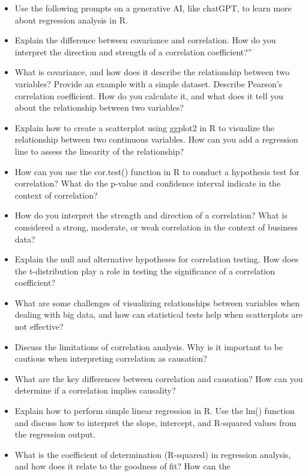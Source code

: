 \documentclass[
  letterpaper,
  DIV=11,
  numbers=noendperiod]{scrreprt}
\begin{document}
\begin{itemize}
\item
  Use the following prompts on a generative AI, like chatGPT, to learn
  more about regression analysis in R.
\item
  Explain the difference between covariance and correlation. How do you
  interpret the direction and strength of a correlation coefficient?''
\item
  What is covariance, and how does it describe the relationship between
  two variables? Provide an example with a simple dataset. Describe
  Pearson's correlation coefficient. How do you calculate it, and what
  does it tell you about the relationship between two variables?
\item
  Explain how to create a scatterplot using ggplot2 in R to visualize
  the relationship between two continuous variables. How can you add a
  regression line to assess the linearity of the relationship?
\item
  How can you use the cor.test() function in R to conduct a hypothesis
  test for correlation? What do the p-value and confidence interval
  indicate in the context of correlation?
\item
  How do you interpret the strength and direction of a correlation? What
  is considered a strong, moderate, or weak correlation in the context
  of business data?
\item
  Explain the null and alternative hypotheses for correlation testing.
  How does the t-distribution play a role in testing the significance of
  a correlation coefficient?
\item
  What are some challenges of visualizing relationships between
  variables when dealing with big data, and how can statistical tests
  help when scatterplots are not effective?
\item
  Discuss the limitations of correlation analysis. Why is it important
  to be cautious when interpreting correlation as causation?
\item
  What are the key differences between correlation and causation? How
  can you determine if a correlation implies causality?
\item
  Explain how to perform simple linear regression in R. Use the lm()
  function and discuss how to interpret the slope, intercept, and
  R-squared values from the regression output.
\item
  What is the coefficient of determination (R-squared) in regression
  analysis, and how does it relate to the goodness of fit? How can the

\end{itemize}
\end{document}
